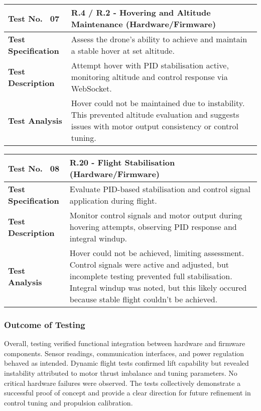 \begin{table}[H]
\centering
\renewcommand{\arraystretch}{1.2}
\begin{tabular}{|p{3.5cm}|p{12cm}|}
\hline
\textbf{Test No. \, 07} & \textbf{R.4 / R.2 - Hovering and Altitude Maintenance} (Hardware/Firmware) \\ \hline
\textbf{Test Specification} & 
Assess the drone's ability to achieve and maintain a stable hover at set altitude. \\ \hline
\textbf{Test Description} & 
Attempt hover with PID stabilisation active, monitoring altitude and control response via WebSocket. \\ \hline
\textbf{Test Analysis} & 
Hover could not be maintained due to instability. This prevented altitude evaluation and suggests issues with motor output consistency or control tuning. \\ \hline
\end{tabular}
\end{table}

\begin{table}[H]
\centering
\renewcommand{\arraystretch}{1.2}
\begin{tabular}{|p{3.5cm}|p{12cm}|}
\hline
\textbf{Test No. \, 08} & \textbf{R.20 - Flight Stabilisation} (Hardware/Firmware) \\ \hline
\textbf{Test Specification} & 
Evaluate PID-based stabilisation and control signal application during flight. \\ \hline
\textbf{Test Description} & 
Monitor control signals and motor output during hovering attempts, observing PID response and integral windup. \\ \hline
\textbf{Test Analysis} & 
Hover could not be achieved, limiting assessment. Control signals were active and adjusted, but incomplete testing prevented full stabilisation. Integral windup was noted, but this likely occured because stable flight couldn't be achieved. \\ \hline
\end{tabular}
\end{table}

\subsubsection{Outcome of Testing} \leavevmode

Overall, testing verified functional integration between hardware and firmware components. Sensor readings, communication interfaces, and power regulation behaved as intended. Dynamic flight tests confirmed lift capability but revealed instability attributed to motor thrust imbalance and tuning parameters. No critical hardware failures were observed. The tests collectively demonstrate a successful proof of concept and provide a clear direction for future refinement in control tuning and propulsion calibration.


